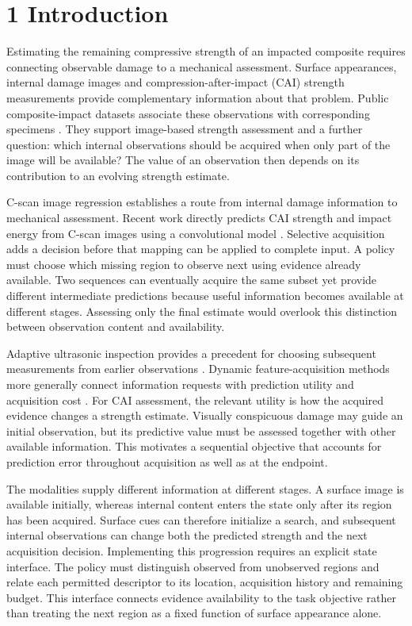\hypertarget{introduction}{%
\section{1 Introduction}\label{introduction}}

Estimating the remaining compressive strength of an impacted composite requires connecting observable damage to a mechanical assessment. Surface appearances, internal damage images and compression-after-impact (CAI) strength measurements provide complementary information about that problem. Public composite-impact datasets associate these observations with corresponding specimens \citep{hasebe2022data, hasebe2025data}. They support image-based strength assessment and a further question: which internal observations should be acquired when only part of the image will be available? The value of an observation then depends on its contribution to an evolving strength estimate.

C-scan image regression establishes a route from internal damage information to mechanical assessment. Recent work directly predicts CAI strength and impact energy from C-scan images using a convolutional model \citep{mack2026}. Selective acquisition adds a decision before that mapping can be applied to complete input. A policy must choose which missing region to observe next using evidence already available. Two sequences can eventually acquire the same subset yet provide different intermediate predictions because useful information becomes available at different stages. Assessing only the final estimate would overlook this distinction between observation content and availability.

Adaptive ultrasonic inspection provides a precedent for choosing subsequent measurements from earlier observations \citep{fuentes2020}. Dynamic feature-acquisition methods more generally connect information requests with prediction utility and acquisition cost \citep{shim2018, janisch2019, covert2023}. For CAI assessment, the relevant utility is how the acquired evidence changes a strength estimate. Visually conspicuous damage may guide an initial observation, but its predictive value must be assessed together with other available information. This motivates a sequential objective that accounts for prediction error throughout acquisition as well as at the endpoint.

The modalities supply different information at different stages. A surface image is available initially, whereas internal content enters the state only after its region has been acquired. Surface cues can therefore initialize a search, and subsequent internal observations can change both the predicted strength and the next acquisition decision. Implementing this progression requires an explicit state interface. The policy must distinguish observed from unobserved regions and relate each permitted descriptor to its location, acquisition history and remaining budget. This interface connects evidence availability to the task objective rather than treating the next region as a fixed function of surface appearance alone.


